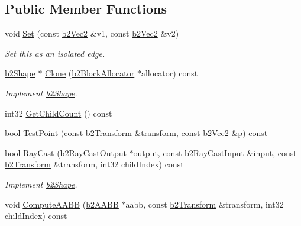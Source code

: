 \subsection*{Public Member Functions}
\begin{DoxyCompactItemize}
\item 
\mbox{\label{classb2EdgeShape_a67dd3b17630a600033cb4380697a4e9d}} 
void \hyperlink{classb2EdgeShape_a67dd3b17630a600033cb4380697a4e9d}{Set} (const \hyperlink{structb2Vec2}{b2\+Vec2} \&v1, const \hyperlink{structb2Vec2}{b2\+Vec2} \&v2)
\begin{DoxyCompactList}\small\item\em Set this as an isolated edge. \end{DoxyCompactList}\item 
\mbox{\label{classb2EdgeShape_a229e0def3c01ae900fedb0cdeb275d39}} 
\hyperlink{classb2Shape}{b2\+Shape} $\ast$ \hyperlink{classb2EdgeShape_a229e0def3c01ae900fedb0cdeb275d39}{Clone} (\hyperlink{classb2BlockAllocator}{b2\+Block\+Allocator} $\ast$allocator) const
\begin{DoxyCompactList}\small\item\em Implement \hyperlink{classb2Shape}{b2\+Shape}. \end{DoxyCompactList}\item 
int32 \hyperlink{classb2EdgeShape_ab675660fbb4a21dc5c89a97a5822f357}{Get\+Child\+Count} () const
\item 
bool \hyperlink{classb2EdgeShape_a23a429c4cf919ff5140ca28b53db43fe}{Test\+Point} (const \hyperlink{structb2Transform}{b2\+Transform} \&transform, const \hyperlink{structb2Vec2}{b2\+Vec2} \&p) const
\item 
\mbox{\label{classb2EdgeShape_a61b1c32765913e6066ef797a5b7f2256}} 
bool \hyperlink{classb2EdgeShape_a61b1c32765913e6066ef797a5b7f2256}{Ray\+Cast} (\hyperlink{structb2RayCastOutput}{b2\+Ray\+Cast\+Output} $\ast$output, const \hyperlink{structb2RayCastInput}{b2\+Ray\+Cast\+Input} \&input, const \hyperlink{structb2Transform}{b2\+Transform} \&transform, int32 child\+Index) const
\begin{DoxyCompactList}\small\item\em Implement \hyperlink{classb2Shape}{b2\+Shape}. \end{DoxyCompactList}\item 
void \hyperlink{classb2EdgeShape_a5dfd37551fa381767374faf0df79c6af}{Compute\+A\+A\+BB} (\hyperlink{structb2AABB}{b2\+A\+A\+BB} $\ast$aabb, const \hyperlink{structb2Transform}{b2\+Transform} \&transform, int32 child\+Index) const

\end{DoxyCompactItemize}
